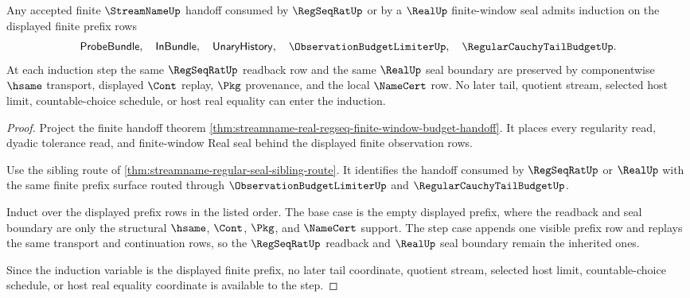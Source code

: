 \begin{theorem}
\label{thm:streamname-finite-window-prefix-induction}
Any accepted finite $\StreamNameUp$ handoff consumed by $\RegSeqRatUp$ or by a $\RealUp$ finite-window seal admits induction on the displayed finite prefix rows
$$
\mathsf{ProbeBundle},\quad
\mathsf{InBundle},\quad
\mathsf{UnaryHistory},\quad
\ObservationBudgetLimiterUp,\quad
\RegularCauchyTailBudgetUp .
$$
At each induction step the same $\RegSeqRatUp$ readback row and the same $\RealUp$ seal boundary are preserved by componentwise $\hsame$ transport, displayed $\Cont$ replay, $\Pkg$ provenance, and the local $\NameCert$ row. No later tail, quotient stream, selected host limit, countable-choice schedule, or host real equality can enter the induction.
\end{theorem}
\begin{proof}
Project the finite handoff theorem \autoref{thm:streamname-real-regseq-finite-window-budget-handoff}. It places every regularity read, dyadic tolerance read, and finite-window Real seal behind the displayed finite observation rows.

Use the sibling route of \autoref{thm:streamname-regular-seal-sibling-route}. It identifies the handoff consumed by $\RegSeqRatUp$ or $\RealUp$ with the same finite prefix surface routed through $\ObservationBudgetLimiterUp$ and $\RegularCauchyTailBudgetUp$.

Induct over the displayed prefix rows in the listed order. The base case is the empty displayed prefix, where the readback and seal boundary are only the structural $\hsame$, $\Cont$, $\Pkg$, and $\NameCert$ support. The step case appends one visible prefix row and replays the same transport and continuation rows, so the $\RegSeqRatUp$ readback and $\RealUp$ seal boundary remain the inherited ones.

Since the induction variable is the displayed finite prefix, no later tail coordinate, quotient stream, selected host limit, countable-choice schedule, or host real equality coordinate is available to the step.
\end{proof}


